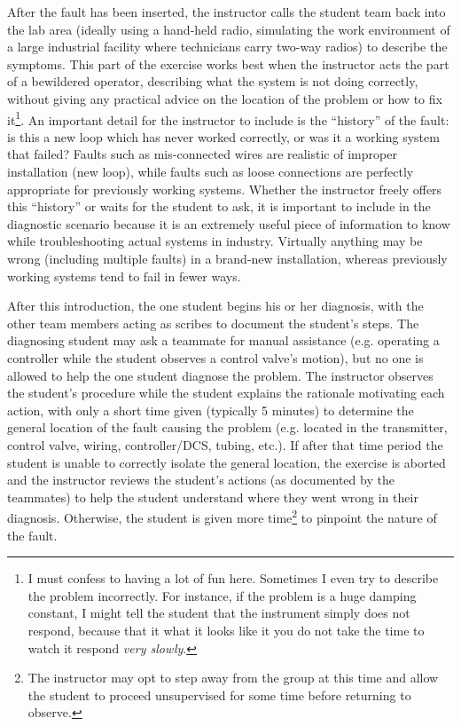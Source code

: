 After the fault has been inserted, the instructor calls the student team back into the lab area (ideally using a hand-held radio, simulating the work environment of a large industrial facility where technicians carry two-way radios) to describe the symptoms.  This part of the exercise works best when the instructor acts the part of a bewildered operator, describing what the system is not doing correctly, without giving any practical advice on the location of the problem or how to fix it\footnote{I must confess to having a lot of fun here.  Sometimes I even try to describe the problem incorrectly.  For instance, if the problem is a huge damping constant, I might tell the student that the instrument simply does not respond, because that it what it looks like it you do not take the time to watch it respond \textit{very slowly}.}.  An important detail for the instructor to include is the ``history'' of the fault: is this a new loop which has never worked correctly, or was it a working system that failed?  Faults such as mis-connected wires are realistic of improper installation (new loop), while faults such as loose connections are perfectly appropriate for previously working systems.  Whether the instructor freely offers this ``history'' or waits for the student to ask, it is important to include in the diagnostic scenario because it is an extremely useful piece of information to know while troubleshooting actual systems in industry.  Virtually anything may be wrong (including multiple faults) in a brand-new installation, whereas previously working systems tend to fail in fewer ways.

After this introduction, the one student begins his or her diagnosis, with the other team members acting as scribes to document the student's steps.  The diagnosing student may ask a teammate for manual assistance (e.g. operating a controller while the student observes a control valve's motion), but no one is allowed to help the one student diagnose the problem.  The instructor observes the student's procedure while the student explains the rationale motivating each action, with only a short time given (typically 5 minutes) to determine the general location of the fault causing the problem (e.g. located in the transmitter, control valve, wiring, controller/DCS, tubing, etc.).  If after that time period the student is unable to correctly isolate the general location, the exercise is aborted and the instructor reviews the student's actions (as documented by the teammates) to help the student understand where they went wrong in their diagnosis.  Otherwise, the student is given more time\footnote{The instructor may opt to step away from the group at this time and allow the student to proceed unsupervised for some time before returning to observe.} to pinpoint the nature of the fault.

